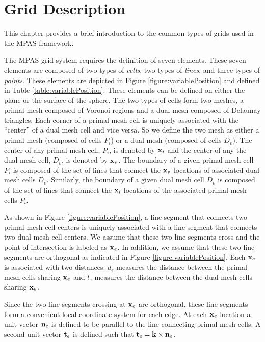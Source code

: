 \chapter{Grid Description}
\label{chap:mpas_grid_description}

This chapter provides a brief introduction to the common types of grids used in the MPAS framework. 

The MPAS grid system requires the definition of seven elements. These seven elements are composed of two types of {\it cells}, two types of {\it lines}, and three types of {\it points}. These elements are depicted in Figure \ref{figure:variablePosition} and defined in Table \ref{table:variablePosition}.  These elements can be defined on either the plane or the surface of the sphere. The two types of cells form two meshes, a primal mesh composed of Voronoi regions and a dual mesh composed of Delaunay triangles. Each corner of a primal mesh cell is uniquely associated with the ``center'' of a dual mesh cell and vice versa. So we define the two mesh as either a primal mesh (composed of cells $P_i$) or a dual mesh (composed of cells $D_v$). The center of any primal mesh cell, $P_i$, is denoted by ${\bf x}_i$ and the center of any the dual mesh cell, $D_v$, is denoted by ${\bf x}_v$. The boundary of a given primal mesh cell $P_i$ is composed of the set of lines that connect the ${\bf x}_v$ locations of associated dual mesh cells $D_v$. Similarly, the boundary of a given dual mesh cell $D_v$ is composed of the set of lines that connect the ${\bf x}_i$ locations of the associated primal mesh cells $P_i$. 

As shown in Figure \ref{figure:variablePosition}, a line segment that connects two primal mesh cell centers is uniquely associated with a line segment that connects two dual mesh cell centers. We assume that these two line segments cross and the point of intersection is labeled as ${\bf x}_e$. In addition, we assume that these two line segments are orthogonal as indicated in Figure \ref{figure:variablePosition}. Each ${\bf x}_e$ is associated with two distances: $d_e$ measures the distance between the primal mesh cells sharing ${\bf x}_e$ and $l_e$ measures the distance between the dual mesh cells sharing ${\bf x}_e$.

Since the two line segments crossing at ${\bf x}_e$ are orthogonal, these line segments form a convenient local coordinate system for each edge. At each ${\bf x}_e$ location a unit vector ${\bf n}_e$ is defined to be parallel to the line connecting primal mesh cells. A second unit vector ${\bf t}_e$ is defined such that ${\bf t}_e = {\bf k} \times {\bf n}_e$.

